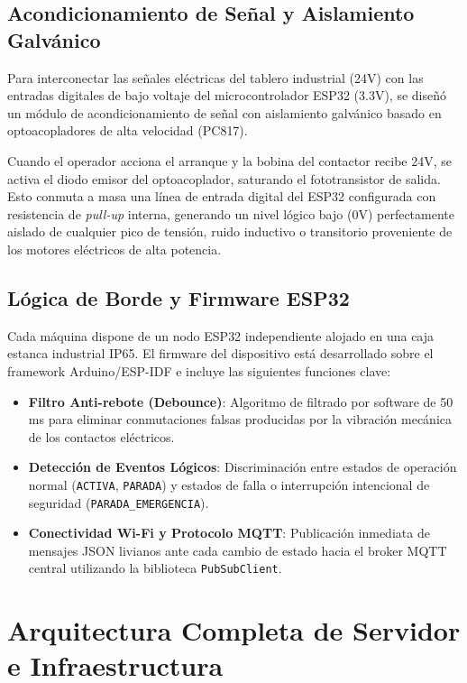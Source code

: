 \documentclass[11pt,a4paper]{article}
\begin{document}
\subsection{Acondicionamiento de Señal y Aislamiento Galvánico}

Para interconectar las señales eléctricas del tablero industrial (24V) con las entradas digitales de bajo voltaje del microcontrolador ESP32 (3.3V), se diseñó un módulo de acondicionamiento de señal con aislamiento galvánico basado en optoacopladores de alta velocidad (PC817). 

Cuando el operador acciona el arranque y la bobina del contactor recibe 24V, se activa el diodo emisor del optoacoplador, saturando el fototransistor de salida. Esto conmuta a masa una línea de entrada digital del ESP32 configurada con resistencia de \textit{pull-up} interna, generando un nivel lógico bajo (0V) perfectamente aislado de cualquier pico de tensión, ruido inductivo o transitorio proveniente de los motores eléctricos de alta potencia.

\subsection{Lógica de Borde y Firmware ESP32}

Cada máquina dispone de un nodo ESP32 independiente alojado en una caja estanca industrial IP65. El firmware del dispositivo está desarrollado sobre el framework Arduino/ESP-IDF e incluye las siguientes funciones clave:
\begin{itemize}
    \item \textbf{Filtro Anti-rebote (Debounce)}: Algoritmo de filtrado por software de 50 ms para eliminar conmutaciones falsas producidas por la vibración mecánica de los contactos eléctricos.
    \item \textbf{Detección de Eventos Lógicos}: Discriminación entre estados de operación normal (\texttt{ACTIVA}, \texttt{PARADA}) y estados de falla o interrupción intencional de seguridad (\texttt{PARADA\_EMERGENCIA}).
    \item \textbf{Conectividad Wi-Fi y Protocolo MQTT}: Publicación inmediata de mensajes JSON livianos ante cada cambio de estado hacia el broker MQTT central utilizando la biblioteca \texttt{PubSubClient}.
\end{itemize}

\section{Arquitectura Completa de Servidor e Infraestructura}
\end{document}

